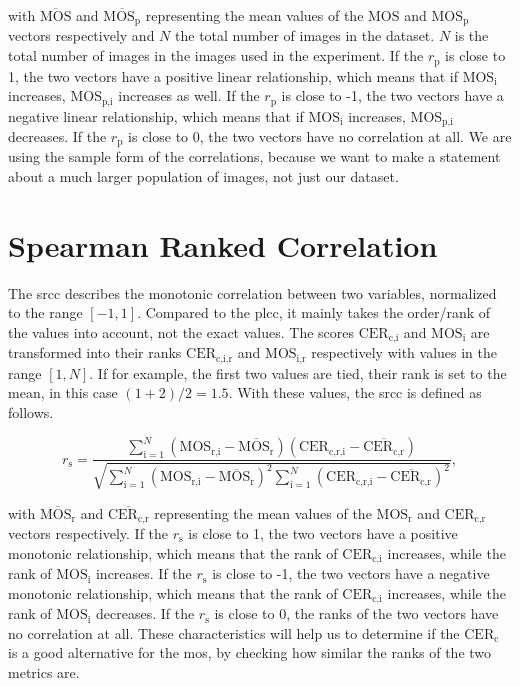 with $\overline{\text{MOS}}$ and $\overline{\text{MOS}_{\text{p}}}$ representing the mean values of the $\text{MOS}$ and $\text{MOS}_{\text{p}}$ vectors respectively and $N$ the total number of images in the dataset.
$N$ is the total number of images in the images used in the experiment.
If the $r_{\text{p}}$ is close to 1, the two vectors have a positive linear relationship, which means that if $\text{MOS}_{\text{i}}$ increases, $\text{MOS}_{\text{p,i}}$ increases as well.
If the $r_{\text{p}}$ is close to -1, the two vectors have a negative linear relationship, which means that if $\text{MOS}_{\text{i}}$ increases, $\text{MOS}_{\text{p,i}}$ decreases.
If the $r_{\text{p}}$ is close to 0, the two vectors have no correlation at all.
We are using the sample form of the correlations, because we want to make a statement about a much larger population of images, not just our dataset.

\section{Spearman Ranked Correlation}
\label{sec:spearman}

The \gls{srcc} \cite{pears_spear_2016} describes the monotonic correlation between two variables, normalized to the range $[-1, 1]$.
Compared to the \gls{plcc}, it mainly takes the order/rank of the values into account, not the exact values.
The scores $\text{CER}_{\text{c,i}}$ and $\text{MOS}_{\text{i}}$ are transformed into their ranks $\text{CER}_{\text{c,i,r}}$ and $\text{MOS}_{\text{i,r}}$ respectively with values in the range $[1, N]$.
If for example, the first two values are tied, their rank is set to the mean, in this case $(1+2)/2 = 1.5$.
With these values, the \gls{srcc} is defined as follows.

\begin{equation}
    r_{\text{s}} = \frac{\sum_{\text{i}=1}^{N}{(\text{MOS}_{\text{r,i}}-\overline{\text{MOS}_{\text{r}}})(\text{CER}_{\text{c,r,i}}-\overline{\text{CER}_{\text{c,r}}})}}{\sqrt{\sum_{\text{i}=1}^{N}{(\text{MOS}_{\text{r,i}}-\overline{\text{MOS}_{\text{r}}})^2}\sum_{\text{i}=1}^{N}{(\text{CER}_{\text{c,r,i}}-\overline{\text{CER}_{\text{c,r}}})^2}}},
    \label{eq:spearman}
\end{equation}

with $\overline{\text{MOS}_{\text{r}}}$ and $\overline{\text{CER}_{\text{c,r}}}$ representing the mean values of the $\text{MOS}_{\text{r}}$ and $\text{CER}_{\text{c,r}}$ vectors respectively.
If the $r_{\text{s}}$ is close to 1, the two vectors have a positive monotonic relationship, which means that the rank of $\text{CER}_{\text{c,i}}$ increases, while the rank of $\text{MOS}_{\text{i}}$ increases.
If the $r_{\text{s}}$ is close to -1, the two vectors have a negative monotonic relationship, which means that the rank of $\text{CER}_{\text{c,i}}$ increases, while the rank of $\text{MOS}_{\text{i}}$ decreases.
If the $r_{\text{s}}$ is close to 0, the ranks of the two vectors have no correlation at all.
These characteristics will help us to determine if the $\text{CER}_{\text{c}}$ is a good alternative for the \gls{mos}, by checking how similar the ranks of the two metrics are.


